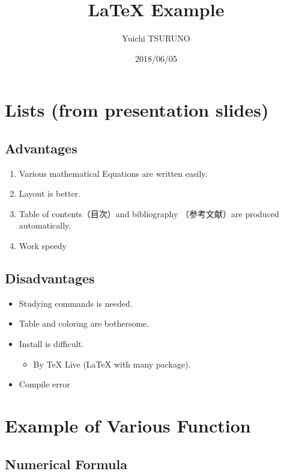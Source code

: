\documentclass[english,a4paper]{jsarticle}
\title{\LaTeX{} Example}
\author{Yuichi TSURUNO}
\date{2018/06/05}
\begin{document}
\pagestyle{empty}
\setlength{\baselineskip}{16pt}%

\maketitle

\tableofcontents%

\listoffigures%

\listoftables%

\newpage%

\pagestyle{headings}

\section{Lists (from presentation slides)}
\subsection{Advantages}
\begin{enumerate}
	\item Various mathematical Equations are written easily.
	\item Layout is better.
	\item Table of contents（目次）and bibliography （参考文献）are produced automatically.
	\item Work speedy
\end{enumerate}

\subsection{Disadvantages}
\begin{itemize}
\item Studying commands is needed.
\item Table and coloring are bothersome.
\item Install is difficult.
\begin{itemize}
	\item By TeX Live (\LaTeX{} with many package).
\end{itemize}
\item Compile error
\end{itemize}

\section{Example of Various Function}
\subsection{Numerical Formula}
\end{document}
